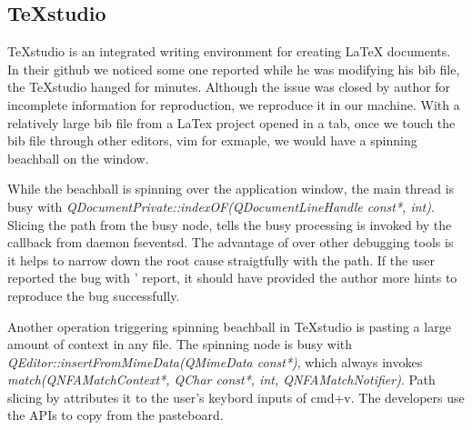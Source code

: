 \subsection{TeXstudio}

TeXstudio is an integrated writing environment for creating LaTeX documents. In
their github we noticed some one reported while he was modifying his bib file,
the TeXstudio hanged for minutes. Although the issue was closed by author for
incomplete information for reproduction, we reproduce it in our machine. With a
relatively large bib file from a LaTex project opened in a tab, once we touch
the bib file through other editors, vim for exmaple, we would have a spinning
beachball on the window.

While the beachball is spinning over the application window, the main thread
is busy with \textit{QDocumentPrivate::indexOF(QDocumentLineHandle const*,
int)}. Slicing the path from the busy node, \xxx tells the busy processing is
invoked by the callback from daemon fseventsd. The advantage of \xxx over other
debugging tools is it helps to narrow down the root cause straigtfully with the
path. If the user reported the bug with \xxx' report, it should have provided
the author more hints to reproduce the bug successfully.

Another operation triggering spinning beachball in TeXstudio is pasting
a large amount of context in any file. The spinning node is busy with
\textit{QEditor::insertFromMimeData(QMimeData const*)}, which always invokes
\textit{match(QNFAMatchContext*, QChar const*, int, QNFAMatchNotifier)}. Path
slicing by \xxx attributes it to the user's keybord inputs of cmd+v. The
developers use the APIs to copy from the pasteboard.
